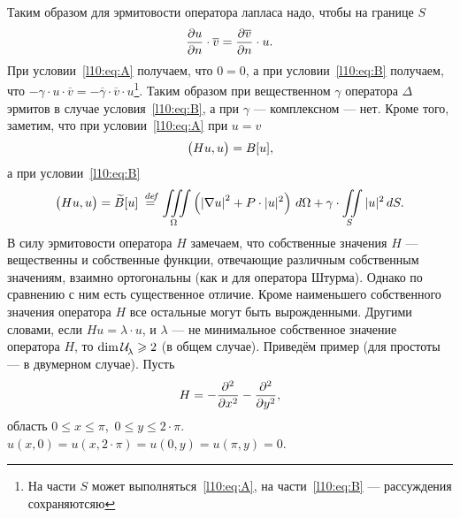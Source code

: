 Таким образом для эрмитовости оператора лапласа надо, чтобы на границе $S$
\begin{equation*}
	\hfill\pder{u}{n}\cdot\overline{v}=\pder{\overline{v}}{n}\cdot u.\hfill
\end{equation*}
При условии~\eqref{l10:eq:A} получаем, что $0=0$, а при условии~\eqref{l10:eq:B} получаем, что $-\gamma\cdot u\cdot\overline{v}=-\overline{\gamma}\cdot\overline{v}\cdot u$\footnote{На части $S$ может выполняться~\eqref{l10:eq:A}, на части~\eqref{l10:eq:B} --- рассуждения сохраняютсяю}. Таким образом при вещественном $\gamma$ оператора $\Delta$ эрмитов в случае условия~\eqref{l10:eq:B}, а при $\gamma$ --- комплексном --- нет. Кроме того, заметим, что при условии~\eqref{l10:eq:A} при $u=v$
\begin{equation}\label{l10:eq:7}
	\hfill\big(Hu,u\big)=B[u],\hfill
\end{equation} 
а при условии~\eqref{l10:eq:B}
\begin{equation}\label{l10:eq:8}
	\hfill\big(Hu,u\big)=\widetilde{B}[u]\eqdef\iiint\limits_{\Omega}\left(\left|\nabla u\right|^2+P\cdot|u|^2\right)\,d\Omega+\gamma\cdot\iint\limits_{S}|u|^2\,dS.\hfill
\end{equation}
В силу эрмитовости оператора $H$ замечаем, что собственные значения $H$ --- вещественны и собственные функции, отвечающие различным собственным значениям, взаимно ортогональны (как и для оператора Штурма). Однако по сравнению с ним есть существенное отличие. Кроме наименьшего собственного значения оператора $H$ все остальные могут быть вырожденными. Другими словами, если $Hu=\lambda\cdot u$, и $\lambda$ --- не минимальное собственное значение оператора $H$, то $\dim\mathcal{U}\!{\mathstrut}_{\lambda}\geqslant2$ (в общем случае). Приведём пример (для простоты --- в двумерном случае). Пусть
\begin{equation*}
	\hfill H=-\pdder{}{x}-\pdder{}{y},\hfill
\end{equation*}
область $0\leqslant x\leqslant\pi$,\ $0\leqslant y\leqslant 2\cdot\pi$. $u(x,0)=u(x,2\cdot\pi)=u(0,y)=u(\pi,y)=0$.



